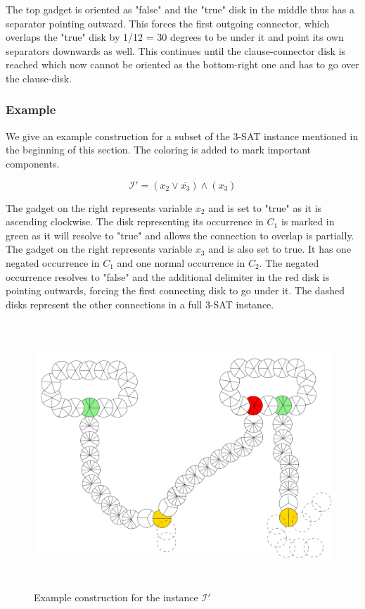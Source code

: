 \documentclass[a4paper,11pt]{article}
\begin{document}
The top gadget is oriented as "false" and the "true" disk in the middle thus has a separator pointing outward. This forces the first outgoing connector, which overlaps the "true" disk by 1/12 = 30 degrees to be under it and point its own separators downwards as well. This continues until the clause-connector disk is reached which now cannot be oriented as the bottom-right one and has to go over the clause-disk.

\subsubsection*{Example}
We give an example construction for a subset of the 3-SAT instance mentioned in the beginning of this section. The coloring is added to mark important components.

\[\mathcal{I'} = (x_2 \vee \overline{x_3}) \wedge (x_3)\]

The gadget on the right represents variable $x_2$ and is set to "true" as it is ascending clockwise. The disk representing its occurrence in $C_1$ is marked in green as it will resolve to "true" and allows the connection to overlap is partially. The gadget on the right represents variable $x_3$ and is also set to true. It has one negated occurrence in $C_1$ and one normal occurrence in $C_2$. The negated occurrence resolves to "false" and the additional delimiter in the red disk is pointing outwards, forcing the first connecting disk to go under it.
The dashed disks represent the other connections in a full 3-SAT instance.

\begin{figure}[H]
  \centering
  \includegraphics[height=10cm]{assets/np-hardness/construction_example.png}
  \caption{Example construction for the instance $\mathcal{I'}$}
\end{figure}
\end{document}
